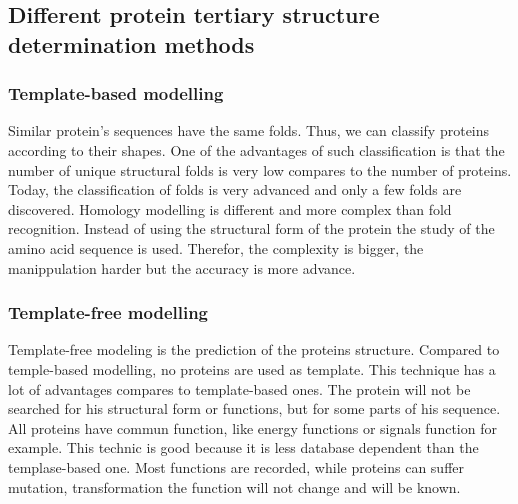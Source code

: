 \subsection{Different protein tertiary structure determination methods} 
\subsubsection{Template-based modelling}
Similar protein's sequences have the same folds. Thus, we can classify proteins according to their shapes. One of the advantages of such classification is that the number of unique structural folds is very low compares to the number of proteins.
\newline
Today, the classification of folds is very advanced and only a few folds are discovered.
Homology modelling is different and more complex than fold recognition. Instead of using the structural form of the protein the study of the amino acid sequence is used. Therefor, the complexity is bigger, the manippulation harder but the accuracy is more advance.

\subsubsection{Template-free modelling}
Template-free modeling is the prediction of the proteins structure. Compared to temple-based modelling, no proteins are used as template. 
\newline
This technique has a lot of advantages compares to template-based ones. The protein will not be searched for his structural form or functions, but for some parts of his sequence. All proteins have commun function,  like energy functions or signals function for example. This technic is good because it is less database dependent than the templase-based one. Most functions are recorded, while proteins can suffer mutation, transformation the function will not change and will be known.
